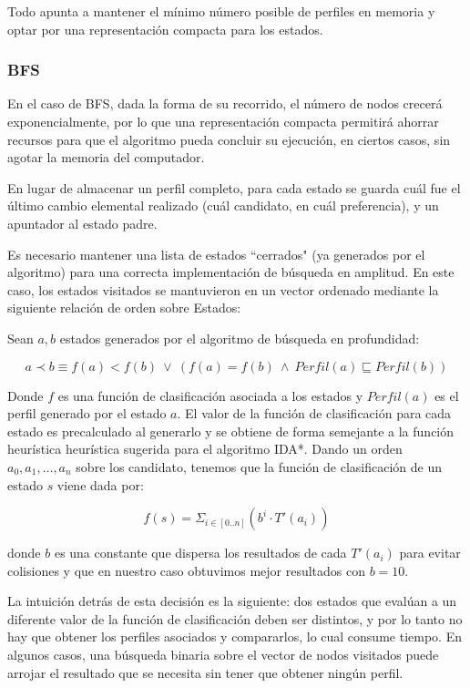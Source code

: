 \documentclass[letterpaper,12pt, titlepage]{article}
\begin{document}
Todo apunta a mantener el mínimo número posible de perfiles en
memoria y optar por una representación compacta para los estados.

\subsubsection*{BFS}

En el caso de BFS, dada la forma de su recorrido, el número de
nodos crecerá exponencialmente, por lo que una representación
compacta permitirá ahorrar recursos para que el algoritmo pueda
concluir su ejecución, en ciertos casos, sin agotar la memoria
del computador.

En lugar de almacenar un perfil completo, para cada estado
se guarda cuál fue el último cambio elemental realizado (cuál
candidato, en cuál preferencia), y un apuntador al estado padre.

Es necesario mantener una lista de estados ``cerrados" (ya
generados por el algoritmo) para una correcta implementación
de búsqueda en amplitud. En este caso, los estados visitados
se mantuvieron en un vector ordenado mediante la siguiente
relación de orden sobre Estados:

Sean $a, b$ estados generados por el algoritmo de búsqueda en
profundidad:

$$a \prec b \equiv f(a) < f(b) \ \vee \ (f(a) = f(b) \ \wedge \ Perfil(a) \sqsubseteq Perfil(b))$$

Donde $f$ es una función de clasificación asociada a los
estados y $Perfil(a)$ es el perfil generado por el estado
$a$. El valor de la función de clasificación para cada estado 
es precalculado al generarlo y se obtiene de forma semejante
a la función heurística heurística sugerida para el algoritmo
IDA*. Dando un orden $a_0, a_1, \ldots, a_n$ sobre los candidato,
tenemos que la función de clasificación de un estado $s$ viene
dada por:

$$f(s) = \Sigma_{i\in [0..n]} (b^i\cdot T'(a_i))$$

\hspace*{-0.5cm}donde $b$ es una constante que dispersa los
resultados de cada $T'(a_i)$ para evitar colisiones y que en
nuestro caso obtuvimos mejor resultados con $b=10$.

\bigskip
La intuición detrás de esta decisión es la siguiente:
dos estados que evalúan a un diferente valor de la función de clasificación
deben ser distintos, y por lo tanto no hay que obtener los perfiles asociados
y compararlos, lo cual consume tiempo. En algunos casos, una búsqueda binaria
sobre el vector de nodos visitados puede arrojar el resultado que se necesita
sin tener que obtener ningún perfil.
\end{document}
